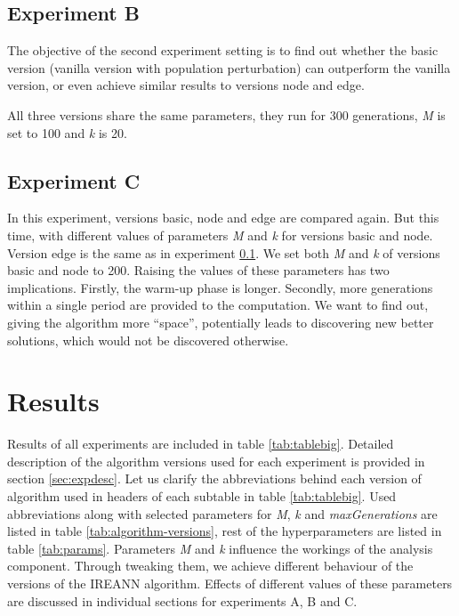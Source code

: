 \documentclass[twoside]{ctuthesis}
\theoremstyle{plain}
\theoremstyle{definition}
\theoremstyle{note}
\begin{document}
\subsection{Experiment B}
\label{sec:expbdesc}

The objective of the second experiment setting is to find out whether the basic version (vanilla version with population perturbation) can outperform the vanilla version, or even achieve similar results to versions node and edge.

All three versions share the same parameters, they run for 300 generations, \emph{M} is set to 100 and \emph{k} is 20.

\subsection{Experiment C}
\label{sec:expcdesc}

In this experiment, versions basic, node and edge are compared again. But this time, with different values of parameters \emph{M} and \emph{k} for versions basic and node. Version edge is the same as in experiment \ref{sec:expbdesc}. We set both \emph{M} and \emph{k} of versions basic and node to 200. Raising the values of these parameters has two implications. Firstly, the warm-up phase is longer. Secondly, more generations within a single period are provided to the computation. We want to find out, giving the algorithm more ``space'', potentially leads to discovering new better solutions, which would not be discovered otherwise.



\section{Results}
\label{sec:results}

Results of all experiments are included in table \ref{tab:tablebig}. Detailed description of the algorithm versions used for each experiment is provided in section \ref{sec:expdesc}.
Let us clarify the abbreviations behind each version of algorithm used in headers of each subtable in table \ref{tab:tablebig}. Used abbreviations along with selected parameters for \emph{M}, \emph{k} and \emph{maxGenerations} are listed in table \ref{tab:algorithm-versions}, rest of the hyperparameters are listed in table \ref{tab:params}. Parameters \emph{M} and \emph{k} influence the workings of the analysis component. Through tweaking them, we achieve different behaviour of the versions of the IREANN algorithm. Effects of different values of these parameters are discussed in individual sections for experiments A, B and C.
\end{document}
